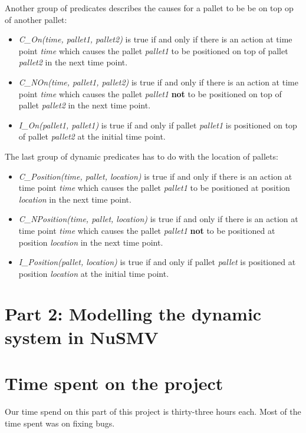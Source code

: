 \documentclass[10pt,a4paper]{article}
\begin{document}
 
Another group of predicates describes the causes for a pallet to be be on top op of another pallet:
\begin{itemize}
  \item \emph{C\_On(time, pallet1, pallet2)} is true if and only if there is an action at time point \emph{time} which causes the pallet \emph{pallet1} to be positioned on top of pallet \emph{pallet2} in the next time point.
  \item \emph{C\_NOn(time, pallet1, pallet2)} is true if and only if there is an action at time point \emph{time} which causes the pallet \emph{pallet1} \textbf{not} to be positioned on top of pallet \emph{pallet2} in the next time point.
   \item \emph{I\_On(pallet1, pallet1)} is true if and only if  pallet \emph{pallet1} is positioned on top of pallet \emph{pallet2} at the initial time point.
   \end{itemize}
   The last group of dynamic predicates has to do with the location of pallets:
   \begin{itemize} 
   \item \emph{C\_Position(time, pallet, location)} is true if and only if there is an action at time point \emph{time} which causes the pallet \emph{pallet1} to be positioned at position \emph{location} in the next time point.
   \item \emph{C\_NPosition(time, pallet, location)} is true if and only if there is an action at time point \emph{time} which causes the pallet \emph{pallet1} \textbf{not} to be positioned at position \emph{location} in the next time point.
   \item \emph{I\_Position(pallet, location)} is true if and only if pallet \emph{pallet} is positioned at position \emph{location} at the initial time point.
\end{itemize}

\section*{Part 2: Modelling the dynamic system in NuSMV}
\section*{Time spent on the project}
Our time spend on this part of this project is thirty-three hours each. Most of the time spent was on fixing bugs.
\end{document}
